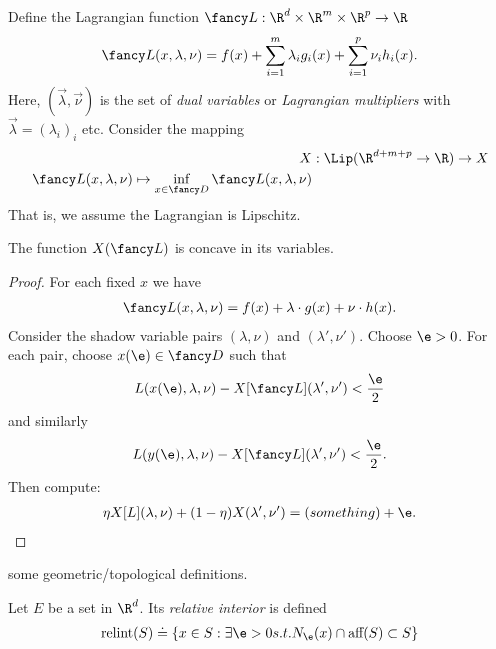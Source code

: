 Define the Lagrangian function 
$\fancy L:\R^d \times \R^m \times \R^p \rightarrow \R$
\begin{align}
	\fancy L(x,\lambda,\nu) = f(x) 
			+ \sum_{i=1}^m \lambda_i g_i(x) 
			+ \sum_{i=1}^p \nu_i h_i(x).
\end{align}
Here, $(\vec{\lambda},\vec{\nu})$ is the set of \emph{dual
variables} or \emph{Lagrangian multipliers} with
$\vec{\lambda} = (\lambda_i)_i$ etc. 
Consider the mapping 
\begin{align}\label{duality_transform}
	X & : \Lip(\R^{d+m+p} \rightarrow \R) \rightarrow X	\\
	\fancy L(x,\lambda,\nu) \mapsto 
	\inf_{x \in \fancy D} \fancy L(x,\lambda,\nu)
\end{align}
That is, we assume the Lagrangian is Lipschitz.
\begin{prop}
	The function $X(\fancy L)$ is concave in its variables.
\end{prop}

\begin{proof}
	For each fixed $x$ we have
	\begin{align}
		\fancy L(x,\lambda,\nu) = f(x) + \lambda \cdot g(x) 
										+ \nu \cdot h(x).
	\end{align}
	Consider the shadow variable pairs $(\lambda,\nu)$ and
	$(\lambda',\nu')$. Choose $\e > 0$. For each pair, choose
	$x(\e) \in \fancy D$ such that 
	\begin{align}
		L(x(\e),\lambda,\nu) - X[\fancy L](\lambda',\nu')  
		< \frac{\e}{2}
	\end{align}
	and similarly
	\begin{align}
		L(y(\e),\lambda,\nu) - X[\fancy L](\lambda',\nu')
		 < \frac{\e}{2}.
	\end{align}
	Then compute:
	\begin{align}
		\eta X[L](\lambda,\nu) + (1-\eta) X(\lambda',\nu') 
		= (something ) + \e.
	\end{align}
	
\end{proof}
 
some geometric/topological definitions.

\begin{defn}
	Let $E$ be a set in $\R^d$. Its \emph{relative interior} is
	defined 
	\begin{align}\label{def:relint}
		\text{relint}(S) \doteq \{ x \in S : \exists \e > 0 s.t. 
									N_\e(x) \cap \text{aff}(S) 
									\subset S \}
	\end{align}
	
\end{defn}

